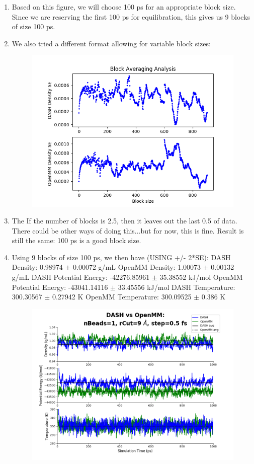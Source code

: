 \documentclass[12pt,reqno]{amsart}
\numberwithin{equation}{section}
\begin{document}
\begin{enumerate}
\begin{figure}[H]
\end{figure}
\item Based on this figure, we will choose 100 ps for an appropriate block size.  Since we are reserving the first 100 ps for equilibration, this gives us 9 blocks of size 100 ps.  
\item We also tried a different format allowing for variable block sizes:
\begin{figure}[H]
\centering
\includegraphics[scale=0.4]{block_averaging_DASH-vs-OpenMM_variable}
\end{figure}
\item The If the number of blocks is 2.5, then it leaves out the last 0.5 of data.  There could be other ways of doing this...but for now, this is fine.  Result is still the same: 100 ps is a good block size.  
\item Using 9 blocks of size 100 ps, we then have (USING +/- 2*SE):
\subitem DASH Density: 0.98974 $\pm$ 0.00072 g/mL
\subitem OpenMM Density: 1.00073 $\pm$ 0.00132 g/mL
\subitem DASH Potential Energy: -42276.85961 $\pm$ 35.38552 kJ/mol
\subitem OpenMM Potential Energy: -43041.14116 $\pm$ 33.45556 kJ/mol
\subitem DASH Temperature: 300.30567 $\pm$ 0.27942 K
\subitem OpenMM Temperature: 300.09525 $\pm$ 0.386 K
\begin{figure}[H]
\centering
\includegraphics[scale=0.7]{MC-MM-nBead1-rCut9-ts05-new}

\end{figure}
\end{enumerate}
\end{document}
